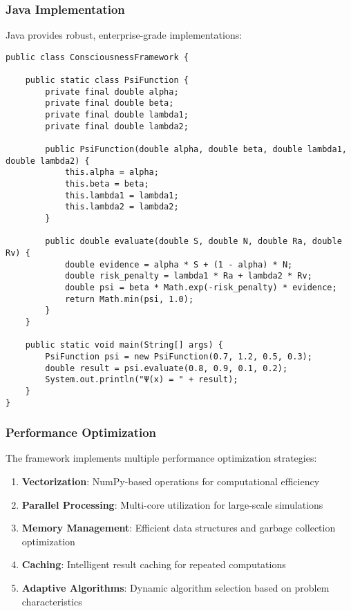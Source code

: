 \documentclass[11pt,a4paper]{article}
\begin{document}
\subsubsection{Java Implementation}
\label{subsubsec:java_implementation}

Java provides robust, enterprise-grade implementations:

\begin{lstlisting}[caption=Java Implementation of Consciousness Framework]
public class ConsciousnessFramework {

    public static class PsiFunction {
        private final double alpha;
        private final double beta;
        private final double lambda1;
        private final double lambda2;

        public PsiFunction(double alpha, double beta, double lambda1, double lambda2) {
            this.alpha = alpha;
            this.beta = beta;
            this.lambda1 = lambda1;
            this.lambda2 = lambda2;
        }

        public double evaluate(double S, double N, double Ra, double Rv) {
            double evidence = alpha * S + (1 - alpha) * N;
            double risk_penalty = lambda1 * Ra + lambda2 * Rv;
            double psi = beta * Math.exp(-risk_penalty) * evidence;
            return Math.min(psi, 1.0);
        }
    }

    public static void main(String[] args) {
        PsiFunction psi = new PsiFunction(0.7, 1.2, 0.5, 0.3);
        double result = psi.evaluate(0.8, 0.9, 0.1, 0.2);
        System.out.println("Ψ(x) = " + result);
    }
}
\end{lstlisting}

\subsubsection{Performance Optimization}
\label{subsubsec:performance_optimization}

The framework implements multiple performance optimization strategies:

\begin{enumerate}
    \item \textbf{Vectorization}: NumPy-based operations for computational efficiency
    \item \textbf{Parallel Processing}: Multi-core utilization for large-scale simulations
    \item \textbf{Memory Management}: Efficient data structures and garbage collection optimization
    \item \textbf{Caching}: Intelligent result caching for repeated computations
    \item \textbf{Adaptive Algorithms}: Dynamic algorithm selection based on problem characteristics
\end{enumerate}
\end{document}
